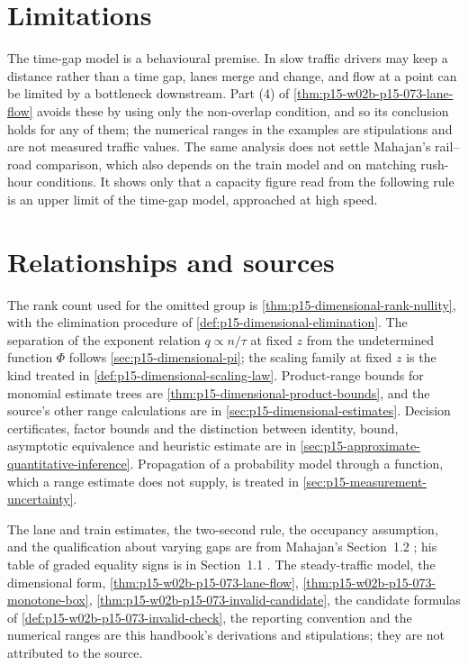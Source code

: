 \section{Limitations}
\label{sec:p15-w02b-p15-073-limits}

The time-gap model is a behavioural premise. In slow traffic drivers may keep
a distance rather than a time gap, lanes merge and change, and flow at a
point can be limited by a bottleneck downstream. Part (4) of
\cref{thm:p15-w02b-p15-073-lane-flow} avoids these by using only the
non-overlap condition, and so its conclusion holds for any of them; the
numerical ranges in the examples are stipulations and are not measured
traffic values. The same analysis does not settle Mahajan's rail--road
comparison, which also depends on the train model and on matching rush-hour
conditions. It shows only that a capacity figure read from the following rule
is an upper limit of the time-gap model, approached at high speed.

\section{Relationships and sources}
\label{sec:p15-w02b-p15-073-relations}

The rank count used for the omitted group is
\cref{thm:p15-dimensional-rank-nullity}, with the elimination procedure of
\cref{def:p15-dimensional-elimination}. The separation of the exponent
relation \(q\propto n/\tau\) at fixed \(z\) from the undetermined function
\(\Phi\) follows \cref{sec:p15-dimensional-pi}; the scaling family at fixed
\(z\) is the kind treated in \cref{def:p15-dimensional-scaling-law}.
Product-range bounds for monomial estimate trees are
\cref{thm:p15-dimensional-product-bounds}, and the source's other range
calculations are in \cref{sec:p15-dimensional-estimates}.
Decision certificates, factor bounds and the distinction between identity,
bound, asymptotic equivalence and heuristic estimate are in
\cref{sec:p15-approximate-quantitative-inference}.
Propagation of a probability model through a function, which a range
estimate does not supply, is treated in
\cref{sec:p15-measurement-uncertainty}.

The lane and train estimates, the two-second rule, the occupancy assumption,
and the qualification about varying gaps are from Mahajan's Section~1.2
\cite[pp.~6--7]{Mahajan2014Insight}; his table of graded equality signs is
in Section~1.1 \cite[p.~5]{Mahajan2014Insight}. The steady-traffic model, the
dimensional form, \cref{thm:p15-w02b-p15-073-lane-flow},
\cref{thm:p15-w02b-p15-073-monotone-box},
\cref{thm:p15-w02b-p15-073-invalid-candidate}, the candidate formulas of
\cref{def:p15-w02b-p15-073-invalid-check}, the reporting convention and the
numerical ranges are this handbook's derivations and stipulations; they are
not attributed to the source.
